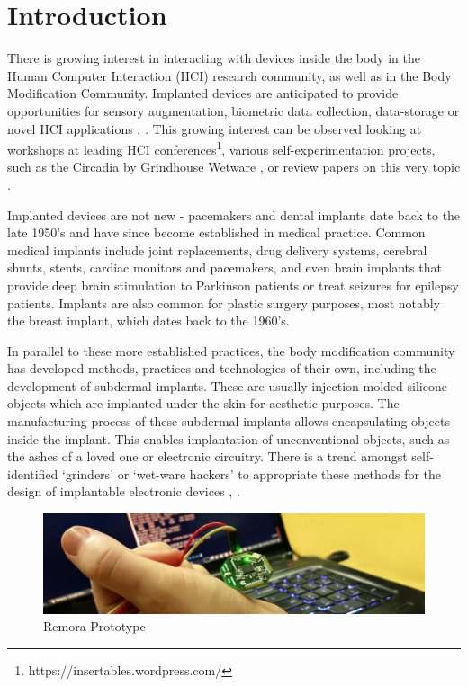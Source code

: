 \documentclass[runningheads,a4paper]{llncs}
\begin{document}
\section{Introduction}
There is growing interest in interacting with devices inside the body in the Human Computer Interaction (HCI) research community, as well as in the Body Modification Community. Implanted devices are anticipated to provide opportunities for sensory augmentation, biometric data collection, data-storage or novel HCI applications \cite{Holz}, \cite{Hameed}. This growing interest can be observed looking at workshops at leading HCI conferences\footnote{https://insertables.wordpress.com/},  various self-experimentation projects, such as the Circadia by Grindhouse Wetware \cite{Motherboard}, or review papers on this very topic \cite{Heffernan}.

Implanted devices are not new - pacemakers and dental implants date back to the late 1950’s and have since become established in medical practice. Common medical implants include joint replacements, drug delivery systems, cerebral shunts, stents, cardiac monitors and pacemakers, and even brain implants that provide deep brain stimulation to Parkinson patients or treat seizures for epilepsy patients. Implants are also common for plastic surgery purposes, most notably the breast implant, which dates back to the 1960’s.

In parallel to these more established practices, the body modification community has developed methods, practices and technologies of their own, including the development of subdermal implants. These are usually injection molded silicone objects which are implanted under the skin for aesthetic purposes. The manufacturing process of these subdermal implants allows encapsulating objects inside the implant. This enables implantation of unconventional objects, such as the ashes of a loved one or electronic circuitry. There is a trend amongst self-identified ‘grinders’ or ‘wet-ware hackers’ to appropriate these methods for the design of implantable electronic devices  \cite{Motherboard}, \cite{Heffernan}.


\begin{figure}
 \includegraphics[scale=1]{device}
 

\caption{Remora Prototype}
\end{figure}
\end{document}
